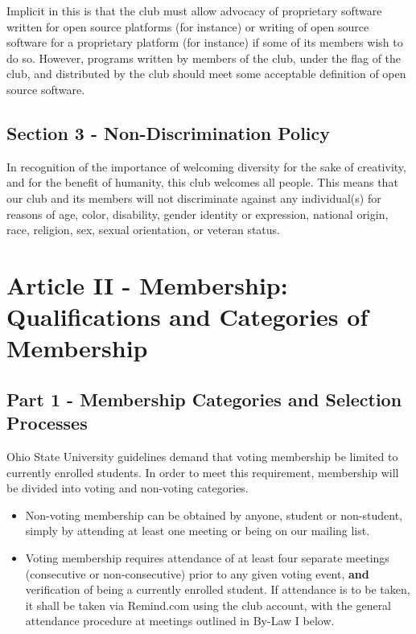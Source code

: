 \documentclass{article}
\begin{document}
	Implicit in this is that the club must allow advocacy of proprietary software written for open source platforms (for instance) or writing of open source software for a proprietary platform (for instance) if some of its members wish to do so. However, programs written by members of the club, under the flag of the club, and distributed by the club should meet some acceptable definition of open source software.

	\subsection{Section 3 - Non-Discrimination Policy}

	In recognition of the importance of welcoming diversity for the sake of creativity, and for the benefit of humanity, this club welcomes all people. This means that our club and its members will not discriminate against any individual(s) for reasons of age, color, disability, gender identity or expression, national origin, race, religion, sex, sexual orientation, or veteran status.

	\section{Article II - Membership: Qualifications and Categories of Membership}

	\subsection{Part 1 - Membership Categories and Selection Processes}
	Ohio State University guidelines demand that voting membership be limited to currently enrolled students.  In order to meet this requirement, membership will be divided into voting and non-voting categories.

	\begin{itemize}
		\item Non-voting membership can be obtained by anyone, student or non-student, simply by attending at least one meeting or being on our mailing list.
		\item Voting membership requires attendance of at least four separate meetings (consecutive or non-consecutive) prior to any given voting event, \textbf{and} verification of being a currently enrolled student.  If attendance is to be taken, it shall be taken via Remind.com using the club account, with the general attendance procedure at meetings outlined in By-Law I below.
	\end{itemize}
\end{document}
